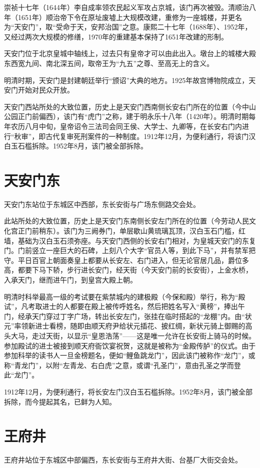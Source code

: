 崇祯十七年（1644年）李自成率领农民起义军攻占京城，该门再次被毁。清顺治八年（1651年）顺治帝下令在原址废墟上大规模改建，重修为一座城楼，并更名为“天安门”，取“受命于天，安邦治国”之意。康熙二十七年（1688年）、1952年，又经过两次大规模的修缮，1970年的重建基本保持了1651年改建的形制。

天安门位于北京皇城中轴线上，过去只有皇帝才可以由此出入。墩台上的城楼大殿东西宽九间、南北深五间，取帝王为“九五”之尊、至高无上的含义。

明清时期，天安门是封建朝廷举行“颁诏”大典的地方。1925年故宫博物院成立，天安门开始对民众开放。

天安门西站所处的大致位置，历史上是天安门西南侧长安右门所在的位置（今中山公园正门前偏西），该门有“虎门”之称，建于明永乐十八年（1420年）。明清时期每年农历八月中旬，皇帝诏令三法司会同王侯、大学士、九卿等，在长安右门内进行“秋审”，即古代复审死刑案件的一种制度。1912年12月，为便利通行，将该门汉白玉石槛拆除。1952年8月，该门被全部拆除。

\section{天安门东}
天安门东站位于东城区中西部，东长安街与广场东侧路交会处。

此站所处的大致位置，历史上是天安门东南侧长安左门所在的位置（今劳动人民文化宫正门前稍东）。该门为三阙券门，单层歇山黄琉璃瓦顶，汉白玉石门槛，红墙，基础为汉白玉石须弥座。与天安门西侧的长安右门相对，为皇城天安门的东复门。门前竖立一座巨大的石碑，上刻八个大字“官员人等，到此下马”，并有禁军把守。平日百官上朝面奏皇上都要从长安左、右门进入，但无论官居几品，爵位多高，都要下马下轿，步行进长安门，经天街（今天安门前的长安街），上金水桥，入承天门，继而进午门，到皇宫大殿上朝。

明清时科举最高一级的考试要在紫禁城内的建极殿（今保和殿）举行，称为“殿试”，凡考取进士的人都要在殿上被传呼姓名，然后把姓名写入“黄榜”，捧出午门，经承天门穿过丁字广场，转出长安左门，张挂在临时搭起的“龙棚”内。由“状元”率领新进士看榜，随即由顺天府尹给状元插花、披红绸，新状元骑上御赐的高头大马，走过天街，以显示“皇恩浩荡”——这是唯一允许在长安街上骑马的时候。参加殿试的进士被接到顺天府衙饮宴祝贺，这就是被称为“金殿传胪”的仪式。由于参加科举的读书人一旦金榜题名，便如“鲤鱼跳龙门”，因此该门被称作“龙门”，或称“青龙门”，以附“左青龙、右白虎”之意，或谓“孔圣门”，意由孔圣之学而登此“龙门”。

1912年12月，为便利通行，将长安左门汉白玉石槛拆除。1952年8月，该门被全部拆除，而今提起其名，已鲜为人知。

\section{王府井}
王府井站位于东城区中部偏西，东长安街与王府井大街、台基厂大街交会处。

